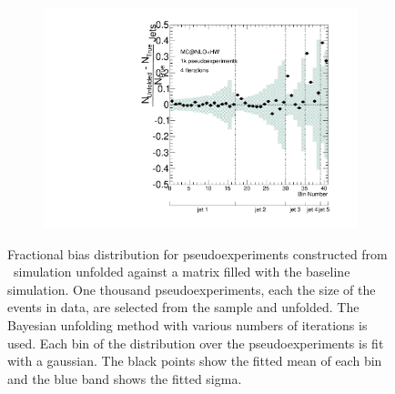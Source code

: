 \begin{figure}
\begin{subfigure}[]{0.5\textwidth}
\end{subfigure}
\begin{subfigure}[]{0.5\textwidth}
\includegraphics[width=\textwidth]{fig/Stress/105200atlfast/FracBias4Iterations.pdf}
\end{subfigure}
\caption{Fractional bias distribution for pseudoexperiments constructed from \newline \mcnlohw\ simulation unfolded against a matrix filled with the baseline simulation. One thousand pseudoexperiments, each the size of the events in data, are selected from the sample and unfolded. The Bayesian unfolding method with various numbers of iterations is used. Each bin of the distribution over the pseudoexperiments is fit with a gaussian. The black points show the fitted mean of each bin and the blue band shows the fitted sigma. }
\label{fig:mcnlohwfrbias}
\end{figure}
\clearpage
